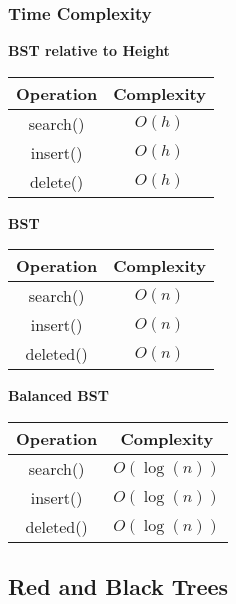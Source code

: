 \documentclass[10pt, 
a4paper, 
oneside, 
headinclude, footinclude, 
BCOR5mm]
{scrartcl}
\begin{document}
\subsubsection{Time Complexity}
\textbf{BST relative to Height}
\begin{center}
    \begin{tabular}{|c|c|}
        \hline
        \textbf{Operation} & \textbf{Complexity} \\
        \hline
        search() & $O(h)$ \\
        \hline
        insert() & $O(h)$ \\
        \hline
        delete() & $O(h)$ \\
        \hline
    \end{tabular}
\end{center}
\textbf{BST}
\begin{center}
    \begin{tabular}{|c|c|}
        \hline
        \textbf{Operation} & \textbf{Complexity} \\
        \hline
        search() & $O(n)$ \\
        \hline
        insert() & $O(n)$ \\
        \hline
        deleted() & $O(n)$ \\
        \hline
    \end{tabular}
\end{center}
\textbf{Balanced BST}
\begin{center}
    \begin{tabular}{|c|c|}
        \hline
        \textbf{Operation} & \textbf{Complexity} \\
        \hline
        search() & $O(\log(n))$ \\
        \hline
        insert() & $O(\log(n))$ \\
        \hline
        deleted() & $O(\log(n))$ \\
        \hline
    \end{tabular}
\end{center}
\newpage
\subsection{Red and Black Trees}
\end{document}
